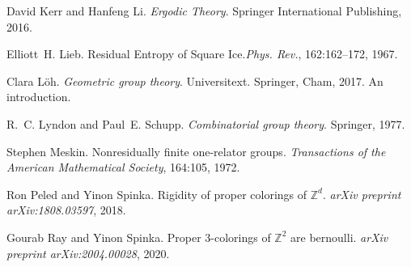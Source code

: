 \documentclass[cupthm,crop,info]{CUP-JNL-ETS}%
\theoremstyle{cupplain}
\theoremstyle{cupdefinition}
\theoremstyle{cupremark}
\theoremstyle{cupproof}
\numberwithin{equation}{section}
\begin{document}
\begin{Backmatter}
\begin{thebibliography}{10}

	David Kerr and Hanfeng Li. {\em Ergodic Theory}. Springer International Publishing, 2016.

	

	Elliott~H. Lieb. {Residual Entropy of Square Ice}.{\em Phys. Rev.}, 162:162--172, 1967.

Clara L\"{o}h.
 {\em Geometric group theory}.
 Universitext. Springer, Cham, 2017.
 An introduction.

	

	R.~C. Lyndon and Paul~E. Schupp. {\em Combinatorial group theory}. Springer, 1977.

	

	Stephen Meskin. Nonresidually finite one-relator groups. {\em Transactions of the American Mathematical Society}, 164:105, 1972.

	

	Ron Peled and Yinon Spinka. Rigidity of proper colorings of {$\mathbb{Z}^{d}$}. {\em arXiv preprint arXiv:1808.03597}, 2018.

	

	Gourab Ray and Yinon Spinka. Proper 3-colorings of {$\mathbb{Z}^{2}$} are bernoulli. {\em arXiv preprint arXiv:2004.00028}, 2020.

	
\end{thebibliography}

\end{Backmatter}
\end{document}
